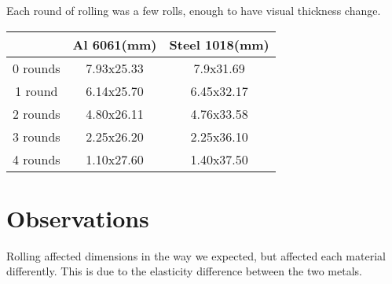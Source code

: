 \documentclass{article}
\begin{document}
Each round of rolling was a few rolls, enough to have visual thickness change.
\begin{table}[h]
\centering
\begin{tabular}{|| c | c | c ||}
\hline
\ & Al 6061(mm) & Steel 1018(mm)\\
\hline
\hline
0 rounds & 7.93x25.33 & 7.9x31.69\\
\hline
1 round & 6.14x25.70 & 6.45x32.17\\
\hline
2 rounds & 4.80x26.11 & 4.76x33.58\\
\hline
3 rounds & 2.25x26.20 & 2.25x36.10\\
\hline
4 rounds & 1.10x27.60 & 1.40x37.50\\
\hline
\end{tabular}
\end{table}
\section{Observations}

Rolling affected dimensions in the way we expected, but affected each material differently. This is due to the elasticity difference between the two metals.
\end{document}
